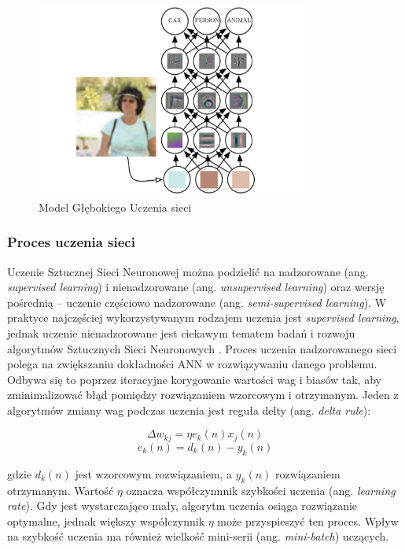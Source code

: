 \begin{figure}[!h]
  \centering
  \includegraphics[width=0.8\textwidth]{img/dnn-object-recog.png}
  \caption{Model Głębokiego Uczenia sieci}
  \label{dnn}
\end{figure}


\subsubsection{Proces uczenia sieci}

Uczenie Sztucznej Sieci Neuronowej można podzielić na nadzorowane (ang. \emph{supervised learning}) i nienadzorowane (ang. \emph{unsupervised learning}) oraz wersję pośrednią -- uczenie częściowo nadzorowane (ang. \emph{semi-supervised learning}). W praktyce najczęściej wykorzystywanym rodzajem uczenia jest \emph{supervised learning}, jednak uczenie nienadzorowane jest ciekawym tematem badań i rozwoju algorytmów Sztucznych Sieci Neuronowych \cite{nielsen2015neural}.
Proces uczenia nadzorowanego sieci polega na zwiększaniu dokładności ANN w rozwiązywaniu danego problemu. Odbywa się to poprzez iteracyjne korygowanie wartości wag i biasów tak, aby zminimalizować błąd pomiędzy rozwiązaniem wzorcowym i otrzymanym. Jeden z algorytmów zmiany wag podczas uczenia jest reguła delty (ang. \emph{delta rule}):


$$\Delta w_{kj} = \eta e_k(n)x_j(n) $$
$$ e_k(n) = d_k(n) - y_k(n) $$

gdzie $d_k(n)$ jest wzorcowym rozwiązaniem, a $y_k(n)$ rozwiązaniem otrzymanym.
Wartość $\eta$ oznacza współczynnnik szybkości uczenia (ang. \emph{learning rate}). Gdy jest wystarczająco mały, algorytm uczenia osiąga rozwiązanie optymalne, jednak większy współczynnik $\eta$ może przyspieszyć ten proces. Wpływ na szybkość uczenia ma również wielkość mini-serii (ang. \emph{mini-batch}) uczących.

